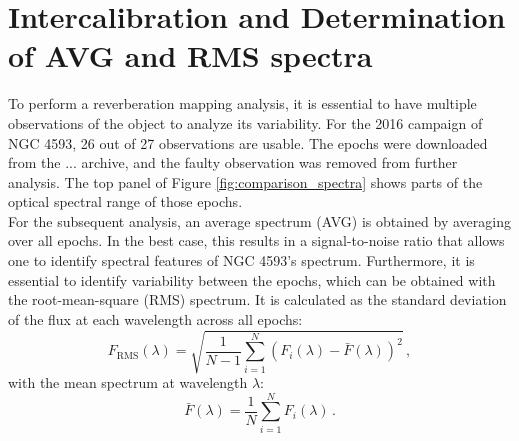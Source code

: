 \newpage


\section{Intercalibration and Determination of AVG and RMS spectra}

To perform a reverberation mapping analysis, it is essential to have multiple observations of the object to analyze its variability. For the 2016 campaign of NGC 4593, 26 out of 27 observations are usable. The epochs were downloaded from the ... archive, and the faulty observation was removed from further analysis. The top panel of Figure \ref{fig:comparison_spectra} shows parts of the optical spectral range of those epochs.\\
For the subsequent analysis, an average spectrum (AVG) is obtained by averaging over all epochs. In the best case, this results in a signal-to-noise ratio that allows one to identify spectral features of NGC 4593's spectrum. Furthermore, it is essential to identify variability between the epochs, which can be obtained with the root-mean-square (RMS) spectrum. It is calculated as the standard deviation of the flux at each wavelength across all epochs:
\begin{equation}
	F_{\mathrm{RMS}}(\lambda) = \sqrt{\frac{1}{N-1} \sum_{i=1}^{N} \left(F_i(\lambda) - \bar{F}(\lambda)\right)^2 } \,,
\end{equation}
with the mean spectrum at wavelength $\lambda$:
\begin{equation}
	\bar{F}(\lambda) = \frac{1}{N} \sum_{i=1}^{N} F_i(\lambda) \,.
\end{equation}

